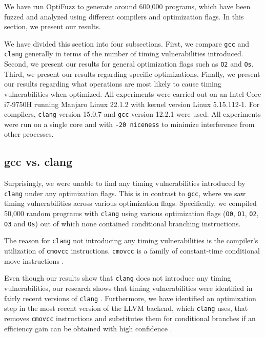 \label{sec:results}
We have run OptiFuzz to generate around 600,000 programs, which have been fuzzed and analyzed using different compilers and optimization flags.
In this section, we present our results.

We have divided this section into four subsections.
First, we compare \texttt{gcc} and \texttt{clang} generally in terms of the number of timing vulnerabilities introduced.
Second, we present our results for general optimization flags such as \texttt{O2} and \texttt{Os}.
Third, we present our results regarding specific optimizations.
Finally, we present our results regarding what operations are most likely to cause timing vulnerabilities when optimized.
All experiments were carried out on an Intel Core i7-9750H running Manjaro Linux 22.1.2 with kernel version Linux 5.15.112-1. 
For compilers, \texttt{clang} version 15.0.7 and \texttt{gcc} version 12.2.1 were used.
All experiments were run on a single core and with \texttt{-20 niceness} to minimize interference from other processes.

\subsection{gcc vs. clang}
\label{sec:gcc-vs-clang}
Surprisingly, we were unable to find any timing vulnerabilities introduced by \texttt{clang} under any optimization flags.
This is in contrast to \texttt{gcc}, where we saw timing vulnerabilities across various optimization flags.
Specifically, we compiled 50,000 random programs with \texttt{clang} using various optimization flags (\texttt{O0}, \texttt{O1}, \texttt{O2}, \texttt{O3} and \texttt{Os}) out of which none contained conditional branching instructions.

The reason for \texttt{clang} not introducing any timing vulnerabilities is the compiler's utilization of \texttt{cmovcc} instructions. 
\texttt{cmovcc} is a family of constant-time conditional move instructions \citep{cmov-from-1995}. 

Even though our results show that \texttt{clang} does not introduce any timing vulnerabilities, our research shows that timing vulnerabilities were identified in fairly recent versions of \texttt{clang} \citep{fact,what-you-c}. 
Furthermore, we have identified an optimization step in the most recent version of the LLVM backend, which \texttt{clang} uses, that removes \texttt{cmovcc} instructions and substitutes them for conditional branches if an efficiency gain can be obtained with high confidence \citep{llvm-optimizing-away-cmov}.

